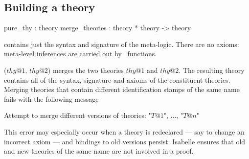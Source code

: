 \subsection{Building a theory}
\label{BuildingATheory}
\begin{ttbox}
pure_thy       : theory
merge_theories : theory * theory -> theory
\end{ttbox}
\begin{ttdescription}
\item[\ttindexbold{pure_thy}] contains just the syntax and signature
  of the meta-logic.  There are no axioms: meta-level inferences are carried
  out by \ML\ functions.
\item[\ttindexbold{merge_theories} ($thy@1$, $thy@2$)] merges the two
  theories $thy@1$ and $thy@2$.  The resulting theory contains all of the
  syntax, signature and axioms of the constituent theories. Merging theories
  that contain different identification stamps of the same name fails with
  the following message
\begin{ttbox}
Attempt to merge different versions of theories: "\(T@1\)", \(\ldots\), "\(T@n\)"
\end{ttbox}
  This error may especially occur when a theory is redeclared --- say to
  change an incorrect axiom --- and bindings to old versions persist.
  Isabelle ensures that old and new theories of the same name are not
  involved in a proof.

\end{ttdescription}

